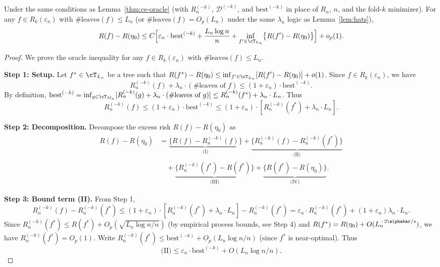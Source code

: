 \documentclass[12pt]{article}
\begin{document}
\begin{lemma}
\label{lem:oracle-near}
Under the same conditions as Lemma~\ref{thm:ce-oracle} (with $R_n^{(-k)}$, $\mathcal{D}^{(-k)}$, and $\text{best}^{(-k)}$ in place of $R_n$, $n$, and the fold-$k$ minimizer). For any $f \in R_k(\varepsilon_n)$ with $\#\text{leaves}(f) \le L_n$ (or $\#\text{leaves}(f) = O_p(L_n)$ under the same $\lambda_n$ logic as Lemma~\ref{lem:hats}),
\[
R(f) - R(\eta_0) \le C \Bigl[ \varepsilon_n \cdot \text{best}^{(-k)} + \frac{L_n \log n}{n} + \inf_{f' \in \cT_{L_n}} \bigl\{ R(f') - R(\eta_0) \bigr\} \Bigr] + o_p(1).
\]
\end{lemma}
\begin{proof}
We prove the oracle inequality for any $f \in R_k(\varepsilon_n)$ with $\#\text{leaves}(f) \le L_n$.

\noindent\textbf{Step 1: Setup.}
Let $f^* \in \cT_{L_n}$ be a tree such that $R(f^*) - R(\eta_0) \le \inf_{f' \in \cT_{L_n}}[R(f') - R(\eta_0)] + o(1)$. Since $f \in R_k(\varepsilon_n)$, we have
\[
R_n^{(-k)}(f) + \lambda_n \cdot (\#\text{leaves of } f) \le (1+\varepsilon_n) \cdot \text{best}^{(-k)}.
\]
By definition, $\text{best}^{(-k)} = \inf_{g \in \cT_{M_n}} [ R_n^{(-k)}(g) + \lambda_n \cdot (\#\text{leaves of } g) ] \le R_n^{(-k)}(f^*) + \lambda_n \cdot L_n$. Thus
\[
R_n^{(-k)}(f) \le (1+\varepsilon_n) \cdot \text{best}^{(-k)} \le (1+\varepsilon_n) \cdot [ R_n^{(-k)}(f^*) + \lambda_n \cdot L_n ].
\]

\noindent\textbf{Step 2: Decomposition.}
Decompose the excess risk $R(f) - R(\eta_0)$ as
\begin{align*}
R(f) - R(\eta_0) &= \underbrace{\bigl\{ R(f) - R_n^{(-k)}(f) \bigr\}}_{\text{(I)}} + \underbrace{\bigl\{ R_n^{(-k)}(f) - R_n^{(-k)}(f^*) \bigr\}}_{\text{(II)}} \\
&\quad + \underbrace{\bigl\{ R_n^{(-k)}(f^*) - R(f^*) \bigr\}}_{\text{(III)}} + \underbrace{\bigl\{ R(f^*) - R(\eta_0) \bigr\}}_{\text{(IV)}}.
\end{align*}

\noindent\textbf{Step 3: Bound term (II).}
From Step 1,
\[
R_n^{(-k)}(f) - R_n^{(-k)}(f^*) \le (1+\varepsilon_n) \cdot [ R_n^{(-k)}(f^*) + \lambda_n \cdot L_n ] - R_n^{(-k)}(f^*) = \varepsilon_n \cdot R_n^{(-k)}(f^*) + (1+\varepsilon_n) \lambda_n \cdot L_n.
\]
Since $R_n^{(-k)}(f^*) \le R(f^*) + O_p(\sqrt{L_n \log n / n})$ (by empirical process bounds, see Step 4) and $R(f^*) = R(\eta_0) + O(L_n^{-2\alphabar/s})$, we have $R_n^{(-k)}(f^*) = O_p(1)$. Write $R_n^{(-k)}(f^*) \le \text{best}^{(-k)} + O_p(L_n \log n / n)$ (since $f^*$ is near-optimal). Thus
\[
\text{(II)} \le \varepsilon_n \cdot \text{best}^{(-k)} + O(L_n \log n / n).
\]


\end{proof}
\end{document}
